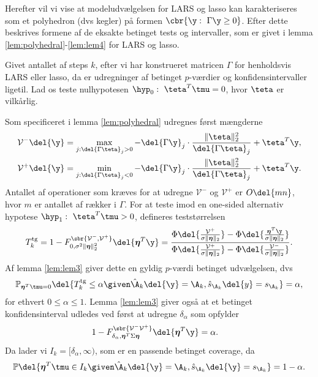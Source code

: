 Herefter vil vi vise at modeludvælgelsen for LARS og lasso kan karakteriseres som et polyhedron (dvs kegler) på formen \(\cbr{\y : \ \Gamma \y \geq 0}\).
Efter dette beskrives formene af de eksakte betinget tests og intervaller, som er givet i lemma \ref{lem:polyhedral}-\ref{lem:lem4} for LARS og lasso.



Givet antallet af steps \(k\), efter vi har konstrueret matricen \(\Gamma\) for henholdsvis LARS eller lasso, da er udregninger af betinget \(p\)-værdier og konfidensintervaller ligetil.
Lad os teste nulhypotesen \(\hyp_0: \ \teta^T \tmu = 0\), hvor \(\teta\) er vilkårlig.

Som specificeret i lemma \ref{lem:polyhedral} udregnes først mængderne
\begin{align*}
\mathcal{V}^- \del{\y} &= \max_{j: \del{\Gamma \teta}_j > 0} - \del{\Gamma \y}_j \cdot \frac{\Vert \teta \Vert_2^2}{\del{\Gamma \teta}_j} + \teta^T \y, \\
\mathcal{V}^+ \del{\y} &= \min_{j: \del{\Gamma \teta}_j < 0} - \del{\Gamma \y}_j \cdot \frac{\Vert \teta \Vert_2^2}{\del{\Gamma \teta}_j} + \teta^T \y.
\end{align*}
Antallet af operationer som kræves for at udregne \(\mathcal{V}^-\) og \(\mathcal{V}^+\) er \(O \del{mn}\), hvor \(m\) er antallet af rækker i \(\Gamma\).
%
For at teste imod en one-sided alternativ hypotese \(\hyp_1: \ \teta^T \tmu > 0\),  defineres teststørrelsen
\begin{align*}
T_k^\text{tg}=1- F_{0, \sigma^2 \Vert \boldsymbol{\eta} \Vert_2^2}^{\sbr{\mathcal{V}^-, \mathcal{V}^+}} \del{\boldsymbol{\eta}^T \y} = \frac{\Phi \del{\frac{\mathcal{V}^+}{\sigma \Vert \boldsymbol{\eta} \Vert_2}}-\Phi \del{\frac{\boldsymbol{\eta}^T \y}{\sigma  \Vert \boldsymbol{\eta} \Vert_2}}}{\Phi \del{\frac{\mathcal{V}^+}{\sigma  \Vert \boldsymbol{\eta} \Vert_2}}-\Phi \del{\frac{\mathcal{V}^-}{\sigma \Vert \boldsymbol{\eta} \Vert_2}}}.
\end{align*}
Af lemma \ref{lem:lem3} giver dette en gyldig \(p\)-værdi betinget udvælgelsen, dvs
\begin{align}
\mathbb{P}_{\boldsymbol{\eta}^T \tmu = 0} \del{T_k^\text{tg} \leq \alpha \given \hat{\A}_k \del{\y} = \A_k, \hat{s}_{\A_k} \del{y} = s_{\A_k}} = \alpha, \label{eq:post_32}
\end{align}
for ethvert \(0 \leq \alpha \leq 1\).
Lemma \ref{lem:lem3} giver også at et betinget konfidensinterval udledes ved først at udregne \(\delta_\alpha\) som opfylder
\begin{align*}
1-F_{\delta_{\alpha}, \boldsymbol{\eta}^T \Sigma \boldsymbol{\eta}}^{\sbr{\mathcal{V}^- \mathcal{V}^+}} \del{\boldsymbol{\eta}^T \y} &= \alpha.
\end{align*}
Da lader vi \(I_k = [\delta_\alpha, \infty)\), som er en passende betinget coverage, da
\begin{align}
\mathbb{P} \del{\boldsymbol{\eta}^T \tmu \in I_k \given \hat{\A}_k \del{\y} = \A_k, \hat{s}_{\A_k} \del{\y} = s_{\A_k}} = 1-\alpha. \label{eq:post_33}
\end{align}

